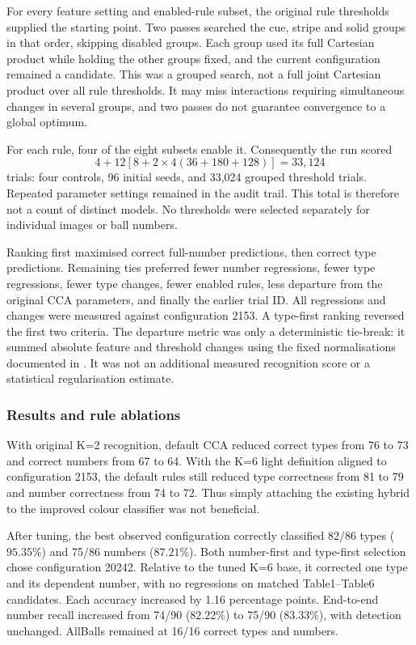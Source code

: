 For every feature setting and enabled-rule subset, the original rule
thresholds supplied the starting point. Two passes searched the cue, stripe
and solid groups in that order, skipping disabled groups. Each group used
its full Cartesian product while holding the other groups fixed, and the
current configuration remained a candidate. This was a grouped search,
not a full joint Cartesian product over all rule thresholds. It may miss
interactions requiring simultaneous changes in several groups, and two
passes do not guarantee convergence to a global optimum.

For each rule, four of the eight subsets enable it. Consequently the run
scored
\[
 4 + 12\left[8+2\times4(36+180+128)\right]=33{,}124
\]
trials: four controls, 96 initial seeds, and 33,024 grouped threshold trials.
Repeated parameter settings remained in the audit trail. This total is
therefore not a count of distinct models. No thresholds were selected
separately for individual images or ball numbers.

Ranking first maximised correct full-number predictions, then correct type
predictions. Remaining ties preferred fewer number regressions, fewer type
regressions, fewer type changes, fewer enabled rules, less departure from
the original CCA parameters, and finally the earlier trial ID. All
regressions and changes were measured against configuration 2153. A
type-first ranking reversed the first two criteria. The departure metric
was only a deterministic tie-break: it summed absolute feature and threshold
changes using the fixed normalisations documented in
. It was not an additional measured
recognition score or a statistical regularisation estimate.

\subsubsection{Results and rule ablations}




With original K=2 recognition, default CCA reduced correct types from 76 to
73 and correct numbers from 67 to 64. With the K=6 light definition aligned
to configuration 2153, the default rules still reduced type correctness
from 81 to 79 and number correctness from 74 to 72. Thus simply attaching
the existing hybrid to the improved colour classifier was not beneficial.

After tuning, the best observed configuration correctly classified 82/86
types ($95.35\%$) and 75/86 numbers ($87.21\%$). Both number-first and
type-first selection chose configuration 20242. Relative to the tuned K=6
base, it corrected one type and its dependent number, with no regressions
on matched Table1--Table6 candidates. Each accuracy increased by 1.16
percentage points. End-to-end number recall increased from 74/90
($82.22\%$) to 75/90 ($83.33\%$), with detection unchanged. AllBalls
remained at 16/16 correct types and numbers.

